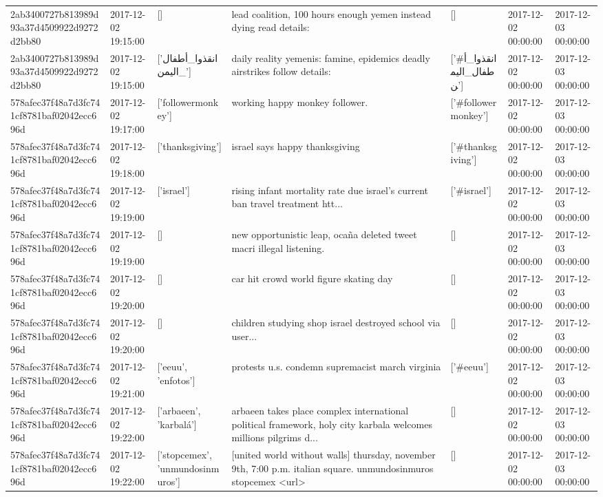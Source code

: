 \begin{tabular}{lllllll}
2ab3400727b813989d93a37d4509922d9272d2bb80 & 2017-12-02 19:15:00 & [] & lead coalition, 100 hours enough yemen instead dying read details: & [] & 2017-12-02 00:00:00 & 2017-12-03 00:00:00 \\
2ab3400727b813989d93a37d4509922d9272d2bb80 & 2017-12-02 19:15:00 & ['انقذوا_أطفال_اليمن'] & daily reality yemenis: famine, epidemics deadly airstrikes follow details: & ['#انقذوا_أطفال_اليمن'] & 2017-12-02 00:00:00 & 2017-12-03 00:00:00 \\
578afec37f48a7d3fc741cf8781baf02042ecc696d & 2017-12-02 19:17:00 & ['followermonkey'] & working happy monkey follower. & ['#followermonkey'] & 2017-12-02 00:00:00 & 2017-12-03 00:00:00 \\
578afec37f48a7d3fc741cf8781baf02042ecc696d & 2017-12-02 19:18:00 & ['thanksgiving'] & israel says happy thanksgiving & ['#thanksgiving'] & 2017-12-02 00:00:00 & 2017-12-03 00:00:00 \\
578afec37f48a7d3fc741cf8781baf02042ecc696d & 2017-12-02 19:19:00 & ['israel'] & rising infant mortality rate due israel's current ban travel treatment htt... & ['#israel'] & 2017-12-02 00:00:00 & 2017-12-03 00:00:00 \\
578afec37f48a7d3fc741cf8781baf02042ecc696d & 2017-12-02 19:19:00 & [] & new opportunistic leap, ocaña deleted tweet macri illegal listening. & [] & 2017-12-02 00:00:00 & 2017-12-03 00:00:00 \\
578afec37f48a7d3fc741cf8781baf02042ecc696d & 2017-12-02 19:20:00 & [] & car hit crowd world figure skating day & [] & 2017-12-02 00:00:00 & 2017-12-03 00:00:00 \\
578afec37f48a7d3fc741cf8781baf02042ecc696d & 2017-12-02 19:20:00 & [] & children studying shop israel destroyed school via user... & [] & 2017-12-02 00:00:00 & 2017-12-03 00:00:00 \\
578afec37f48a7d3fc741cf8781baf02042ecc696d & 2017-12-02 19:21:00 & ['eeuu', 'enfotos'] & protests u.s. condemn supremacist march virginia & ['#eeuu'] & 2017-12-02 00:00:00 & 2017-12-03 00:00:00 \\
578afec37f48a7d3fc741cf8781baf02042ecc696d & 2017-12-02 19:22:00 & ['arbaeen', 'karbalá'] & arbaeen takes place complex international political framework, holy city karbala welcomes millions pilgrims d... & [] & 2017-12-02 00:00:00 & 2017-12-03 00:00:00 \\
578afec37f48a7d3fc741cf8781baf02042ecc696d & 2017-12-02 19:22:00 & ['stopcemex', 'unmundosinmuros'] & [united world without walls] thursday, november 9th, 7:00 p.m. italian square. unmundosinmuros stopcemex <url> & [] & 2017-12-02 00:00:00 & 2017-12-03 00:00:00 \\

\end{tabular}
